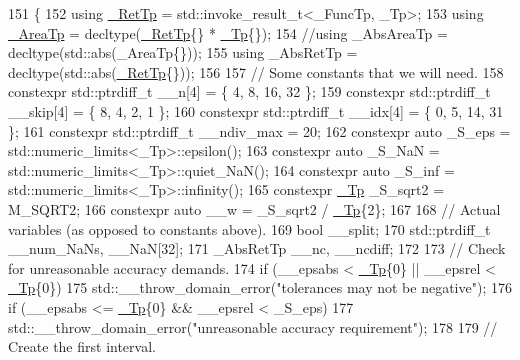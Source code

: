 \begin{DoxyCode}
151     \{
152       \textcolor{keyword}{using} \hyperlink{namespace____gnu__cxx_a886e03ece3d53ff7fa6c098a40f93fa5}{\_RetTp} = std::invoke\_result\_t<\_FuncTp, \_Tp>;
153       \textcolor{keyword}{using} \hyperlink{namespace____gnu__cxx_ae97a51b75e19c30f48d27fac4664de6e}{\_AreaTp} = decltype(\hyperlink{namespace____gnu__cxx_a886e03ece3d53ff7fa6c098a40f93fa5}{\_RetTp}\{\} * \hyperlink{namespace____gnu__cxx_a3b19a9c800ca194374ef9172290f7d79}{\_Tp}\{\});
154       \textcolor{comment}{//using \_AbsAreaTp = decltype(std::abs(\_AreaTp\{\}));}
155       \textcolor{keyword}{using} \_AbsRetTp = decltype(std::abs(\hyperlink{namespace____gnu__cxx_a886e03ece3d53ff7fa6c098a40f93fa5}{\_RetTp}\{\}));
156 
157       \textcolor{comment}{// Some constants that we will need.}
158       constexpr std::ptrdiff\_t \_\_n[4] = \{ 4, 8, 16, 32 \};
159       constexpr std::ptrdiff\_t \_\_skip[4] = \{ 8, 4, 2, 1 \};
160       constexpr std::ptrdiff\_t \_\_idx[4] = \{ 0, 5, 14, 31 \};
161       constexpr std::ptrdiff\_t \_\_ndiv\_max = 20;
162       constexpr \textcolor{keyword}{auto} \_S\_eps = std::numeric\_limits<\_Tp>::epsilon();
163       constexpr \textcolor{keyword}{auto} \_S\_NaN = std::numeric\_limits<\_Tp>::quiet\_NaN();
164       constexpr \textcolor{keyword}{auto} \_S\_inf = std::numeric\_limits<\_Tp>::infinity();
165       constexpr \hyperlink{namespace____gnu__cxx_a3b19a9c800ca194374ef9172290f7d79}{\_Tp} \_S\_sqrt2 = M\_SQRT2;
166       constexpr \textcolor{keyword}{auto} \_\_w = \_S\_sqrt2 / \hyperlink{namespace____gnu__cxx_a3b19a9c800ca194374ef9172290f7d79}{\_Tp}\{2\};
167 
168       \textcolor{comment}{// Actual variables (as opposed to constants above).}
169       \textcolor{keywordtype}{bool} \_\_split;
170       std::ptrdiff\_t \_\_num\_NaNs, \_\_NaN[32];
171       \_AbsRetTp \_\_nc, \_\_ncdiff;
172 
173       \textcolor{comment}{// Check for unreasonable accuracy demands.}
174       \textcolor{keywordflow}{if} (\_\_epsabs < \hyperlink{namespace____gnu__cxx_a3b19a9c800ca194374ef9172290f7d79}{\_Tp}\{0\} || \_\_epsrel < \hyperlink{namespace____gnu__cxx_a3b19a9c800ca194374ef9172290f7d79}{\_Tp}\{0\})
175         std::\_\_throw\_domain\_error(\textcolor{stringliteral}{"tolerances may not be negative"});
176       \textcolor{keywordflow}{if} (\_\_epsabs <= \hyperlink{namespace____gnu__cxx_a3b19a9c800ca194374ef9172290f7d79}{\_Tp}\{0\} && \_\_epsrel < \_S\_eps)
177         std::\_\_throw\_domain\_error(\textcolor{stringliteral}{"unreasonable accuracy requirement"});
178 
179       \textcolor{comment}{// Create the first interval.}

\end{DoxyCode}
